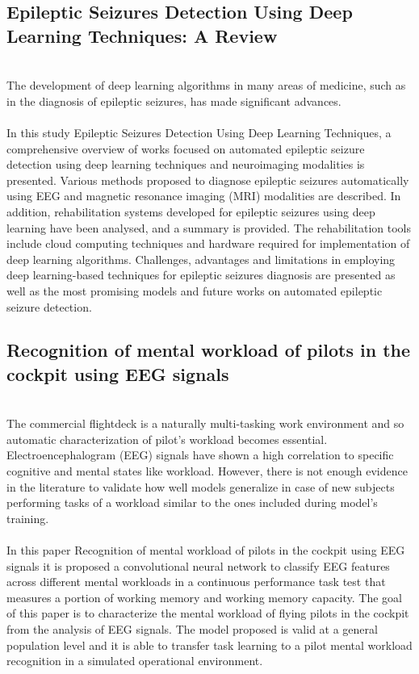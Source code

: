 \subsection{Epileptic Seizures Detection Using Deep Learning Techniques: A Review}
\leavevmode\\
The development of deep learning algorithms in many areas of medicine, such as in the diagnosis of epileptic seizures, has made significant advances.
\\\\
In this study Epileptic Seizures Detection Using Deep Learning Techniques\cite{relatedwork2}, a comprehensive overview of works focused on automated epileptic seizure detection using deep learning techniques and neuroimaging modalities is presented. Various methods proposed to diagnose epileptic seizures automatically using EEG and magnetic resonance imaging (MRI) modalities are described. In addition, rehabilitation systems developed for epileptic seizures using deep learning have been analysed, and a summary is provided. The rehabilitation tools include cloud computing techniques and hardware required for implementation of deep learning algorithms. Challenges, advantages and limitations in employing deep learning-based techniques for epileptic seizures diagnosis are presented as well as the most promising models and future works on automated epileptic seizure detection.
\\


\subsection{Recognition of mental workload of pilots in the cockpit using EEG signals}
\leavevmode\\
The commercial flightdeck is a naturally multi-tasking work environment and so automatic characterization of pilot’s workload becomes essential. Electroencephalogram (EEG) signals have shown a high correlation to specific cognitive and mental states like workload. However, there is not enough evidence in the literature to validate how well models generalize in case of new subjects performing tasks of a workload similar to the ones included during model’s training.
\\\\
In this paper Recognition of mental workload of pilots in the cockpit using EEG signals\cite{relatedwork3} it is proposed a convolutional neural network to classify EEG features across different mental workloads in a continuous performance task test that measures a portion of working memory and working memory capacity. The goal of this paper is to characterize the mental workload of flying pilots in the cockpit from the analysis of EEG signals. The model proposed is valid at a general population level and it is able to transfer task learning to a pilot mental workload recognition in a simulated operational environment.
\\
